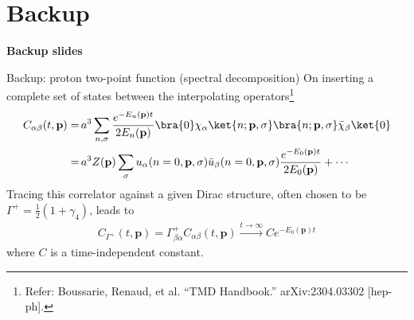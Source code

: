 \section*{Backup}

\begin{frame}
  \centering \Huge \textbf{Backup slides}
\end{frame}

\begin{frame}{Backup: proton two-point function (spectral decomposition)}
  On inserting a complete set of states between the interpolating operators\footnote{Refer: Boussarie, Renaud, et al. ``TMD Handbook.'' arXiv:2304.03302 [hep-ph].}
  \begin{align*}
    C_{\alpha\beta}(t,\mathbf{p})=&\,a^{3}\sum_{n,\sigma}\frac{e^{-E_{n}(\mathbf{p})t}}{2E_{n}(\mathbf{p})}\bra{0}\chi_{\alpha}\ket{n;\mathbf{p},\sigma}\bra{n;\mathbf{p},\sigma}\bar{\chi}_{\beta}\ket{0}\\
    =&\,a^{3}Z(\mathbf{p})\sum_{\sigma}u_{\alpha}(n=0,\mathbf{p},\sigma)\bar{u}_{\beta}(n=0,\mathbf{p},\sigma)\frac{e^{-E_{0}(\mathbf{p})t}}{2E_{0}(\mathbf{p})}+\cdots
  \end{align*}
  Tracing this correlator against a given Dirac structure, often chosen to be $\Gamma^{+}=\frac{1}{2}(1+\gamma_{4})$, leads to
  \begin{align*}
    \boxed{C_{\Gamma^{+}}(t,\mathbf{p})}=\Gamma^{+}_{\beta\alpha}C_{\alpha\beta}(t,\mathbf{p})\xrightarrow{t\rightarrow\infty}\boxed{Ce^{-E_{0}(\mathbf{p})t}}
  \end{align*}
  where $C$ is a time-independent constant.
\end{frame}

